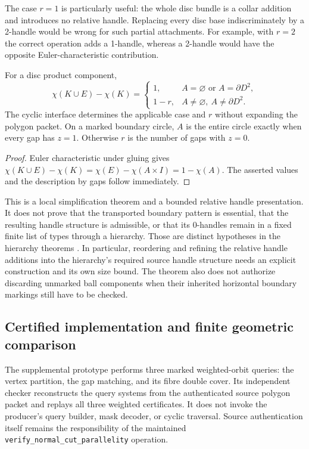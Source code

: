 The case $r=1$ is particularly useful: the whole disc bundle is a collar
addition and introduces no relative handle.  Replacing every disc base
indiscriminately by a 2-handle would be wrong for such partial attachments.
For example, with $r=2$ the correct operation adds a 1-handle, whereas a
2-handle would have the opposite Euler-characteristic contribution.

\begin{corollary}
For a disc product component,
\[
 \chi(K\cup E)-\chi(K)=
 \begin{cases}
 1,&A=\varnothing\text{ or }A=\partial D^2,\\
 1-r,&A\neq\varnothing,\ A\neq\partial D^2.
 \end{cases}
\]
The cyclic interface determines the applicable case and $r$ without
expanding the polygon packet.  On a marked boundary circle, $A$ is the
entire circle exactly when every gap has $z=1$.  Otherwise $r$ is the
number of gaps with $z=0$.
\end{corollary}
\begin{proof}
Euler characteristic under gluing gives
$\chi(K\cup E)-\chi(K)=\chi(E)-\chi(A\times I)=1-\chi(A)$.
The asserted values and the description by gaps follow immediately.
\end{proof}

This is a local simplification theorem and a bounded relative handle
presentation.  It does not prove that the transported boundary pattern is
essential, that the resulting handle structure is admissible, or that its
0-handles remain in a fixed finite list of types through a hierarchy.
Those are distinct hypotheses in the hierarchy theorems
\cite{Lackenby2026}.  In particular, reordering and refining the relative
handle additions into the hierarchy's required source handle structure
needs an explicit construction and its own size bound.  The theorem also
does not authorize discarding unmarked ball components when their inherited
horizontal boundary markings still have to be checked.

\subsection{Certified implementation and finite geometric comparison}

The supplemental prototype performs three marked weighted-orbit queries:
the vertex partition, the gap matching, and its fibre double cover.  Its
independent checker reconstructs the query systems from the authenticated
source polygon packet and replays all three weighted certificates.  It
does not invoke the producer's query builder, mask decoder, or cyclic
traversal.  Source authentication itself remains the responsibility of
the maintained \texttt{verify\_normal\_cut\_parallelity} operation.

